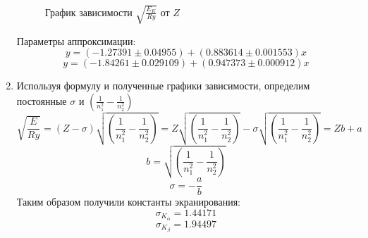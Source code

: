 \documentclass[a4paper, 12pt]{article}
\begin{document}
\begin{enumerate}
\begin{figure}[!htb]
	\caption{График зависимости $\sqrt{\frac{E_K}{Ry}}$ от $Z$}
	\end{figure}
	\par
	Параметры аппроксимации:
	\begin{equation*}
		y=(-1.27391\pm 0.04955)+(0.883614\pm 0.001553)x
	\end{equation*}
	\begin{equation*}
		y=(-1.84261\pm 0.029109)+(0.947373\pm 0.000912)x
	\end{equation*}
	\item Используя формулу и полученные графики зависимости, определим постоянные $\sigma$ и $\left(\frac{1}{n_1^2}-\frac{1}{n_2^2}\right)$
	\begin{equation*}
		\sqrt{\frac{E}{Ry}}=(Z-\sigma)\sqrt{\left(\frac{1}{n_1^2}-\frac{1}{n_2^2}\right)}=Z\sqrt{\left(\frac{1}{n_1^2}-\frac{1}{n_2^2}\right)}-\sigma\sqrt{\left(\frac{1}{n_1^2}-\frac{1}{n_2^2}\right)}=Zb+a
	\end{equation*}
	\begin{equation*}
		b=\sqrt{\left(\frac{1}{n_1^2}-\frac{1}{n_2^2}\right)}
	\end{equation*}
	\begin{equation*}
		\sigma=-\frac{a}{b}
	\end{equation*}
	Таким образом получили константы экранирования:
	\begin{equation*}
		\sigma_{K_\alpha}=1.44171
	\end{equation*}
	\begin{equation*}
		\sigma_{K_\beta}=1.94497
	\end{equation*}
\end{enumerate}
\end{document}
